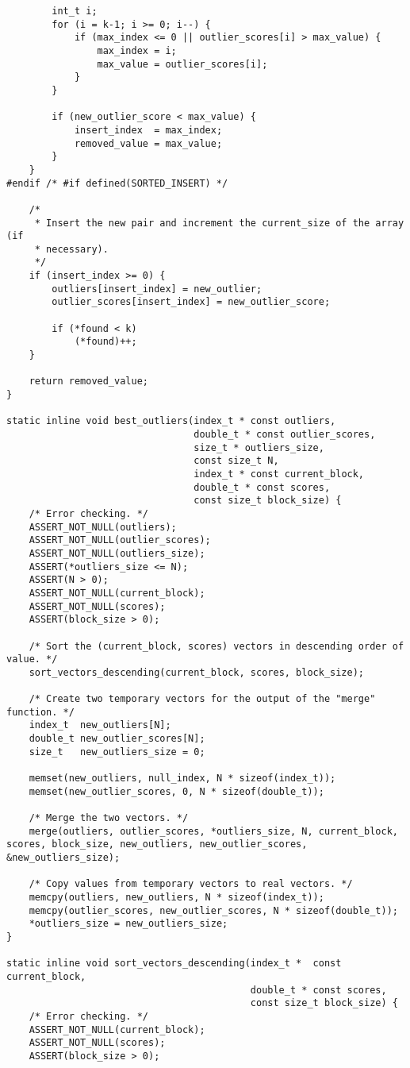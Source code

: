 \begin{lstlisting}
		int_t i;
		for (i = k-1; i >= 0; i--) {
			if (max_index <= 0 || outlier_scores[i] > max_value) {
				max_index = i;
				max_value = outlier_scores[i];
			}
		}
		
		if (new_outlier_score < max_value) {
			insert_index  = max_index;
			removed_value = max_value;
		}
	}
#endif /* #if defined(SORTED_INSERT) */
	
	/*
	 * Insert the new pair and increment the current_size of the array (if
	 * necessary).
	 */
	if (insert_index >= 0) {
		outliers[insert_index] = new_outlier;
		outlier_scores[insert_index] = new_outlier_score;
		
		if (*found < k)
			(*found)++;
	}
	
	return removed_value;
}

static inline void best_outliers(index_t * const outliers,
								 double_t * const outlier_scores,
								 size_t * outliers_size,
								 const size_t N,
								 index_t * const current_block,
								 double_t * const scores,
								 const size_t block_size) {
	/* Error checking. */
	ASSERT_NOT_NULL(outliers);
	ASSERT_NOT_NULL(outlier_scores);
	ASSERT_NOT_NULL(outliers_size);
	ASSERT(*outliers_size <= N);
	ASSERT(N > 0);
	ASSERT_NOT_NULL(current_block);
	ASSERT_NOT_NULL(scores);
	ASSERT(block_size > 0);
	
	/* Sort the (current_block, scores) vectors in descending order of value. */
	sort_vectors_descending(current_block, scores, block_size);
	
	/* Create two temporary vectors for the output of the "merge" function. */
	index_t  new_outliers[N];
	double_t new_outlier_scores[N];
	size_t   new_outliers_size = 0;
	
	memset(new_outliers, null_index, N * sizeof(index_t));
	memset(new_outlier_scores, 0, N * sizeof(double_t));
	
	/* Merge the two vectors. */
	merge(outliers, outlier_scores, *outliers_size, N, current_block, scores, block_size, new_outliers, new_outlier_scores, &new_outliers_size);
	
	/* Copy values from temporary vectors to real vectors. */
	memcpy(outliers, new_outliers, N * sizeof(index_t));
	memcpy(outlier_scores, new_outlier_scores, N * sizeof(double_t));
	*outliers_size = new_outliers_size;
}

static inline void sort_vectors_descending(index_t *  const current_block,
										   double_t * const scores,
										   const size_t block_size) {
	/* Error checking. */
	ASSERT_NOT_NULL(current_block);
	ASSERT_NOT_NULL(scores);
	ASSERT(block_size > 0);
	

\end{lstlisting}
